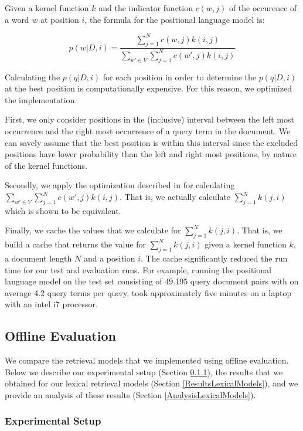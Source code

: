 Given a kernel function $k$ and the indicator function 
$c(w,j)$ of the occurence of a word $w$ at position $i$,
the formula for the positional language model is:

\begin{equation*}
p(w|D,i) = \frac{\sum_{j=1}^N c(w,j)k(i,j)}
{\sum_{w' \in V} \sum_{j=1}^N c(w',j)k(i,j)} 
\end{equation*}

Calculating the $p(q|D,i)$ for each position
in order to determine the $p(q|D,i)$ at the 
best position is computationally expensive.
For this reason, we optimized the implementation.

First, we only consider positions in the (inclusive) interval
between the left most occurrence and the right most
occurrence of a query term in the document.
We can savely assume that the best position is within this interval
since the excluded positions have lower probability
than the left and right most positions,
by nature of the kernel functions.

Secondly, we apply the optimization 
described in \cite{PLM} for calculating
$\sum_{w' \in V} \sum_{j=1}^N c(w',j)k(i,j)$.
That is, we actually calculate 
$\sum_{j=1}^N k(j,i)$ which is shown to be equivalent.

Finally, we cache the values that we calculate for 
$\sum_{j=1}^N k(j,i)$. That is,
we build a cache that returns the
value for $\sum_{j=1}^N k(j,i)$ given
a kernel function $k$, a document length $N$
and a position $i$. The cache
significantly reduced the run time
for our test and evaluation runs.
For example, running the positional
language model on the test set 
consisting of 49.195 query document pairs
with on average 4.2 query terms per query,
took approximately five minutes
on a laptop with an intel i7 processor.

\subsection{Offline Evaluation}
\label{LexicalModels:Evaluation}

We compare the retrieval models that we implemented
using offline evaluation. Below we describe
our experimental setup (Section \ref{ExperimentalSetup}), 
the results that we obtained for our lexical retrieval models 
(Section \ref{ResultsLexicalModels}), 
and we provide an analysis of these results 
(Section \ref{AnalysisLexicalModels}).

\subsubsection{Experimental Setup}
\label{ExperimentalSetup}

